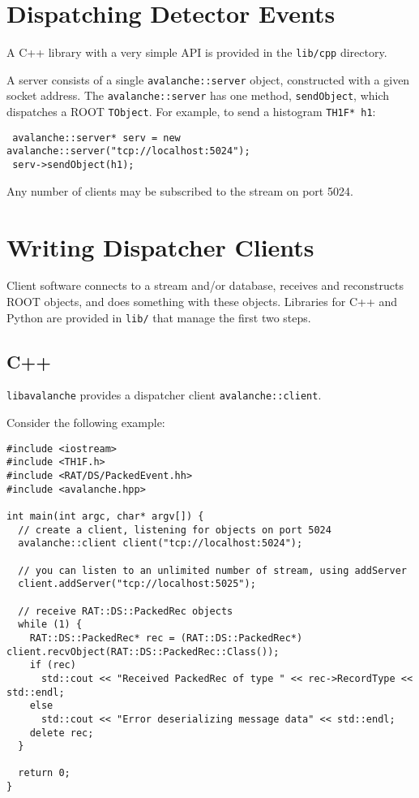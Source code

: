 \documentclass{article}
\begin{document}
\section{Dispatching Detector Events}
A C++ library with a very simple API is provided in the {\tt lib/cpp} directory.

A server consists of a single {\tt avalanche::server} object, constructed with a given socket address. The {\tt avalanche::server} has one method, {\tt sendObject}, which dispatches a ROOT {\tt TObject}. For example, to send a histogram {\tt TH1F* h1}:

\begin{verbatim}
 avalanche::server* serv = new avalanche::server("tcp://localhost:5024");
 serv->sendObject(h1);
\end{verbatim}
Any number of clients may be subscribed to the stream on port 5024.

\section{Writing Dispatcher Clients}
Client software connects to a stream and/or database, receives and reconstructs ROOT objects, and does something with these objects. Libraries for C++ and Python are provided in {\tt lib/} that manage the first two steps.

\subsection{C++}
{\tt libavalanche} provides a dispatcher client {\tt avalanche::client}.

Consider the following example:

\begin{verbatim}
#include <iostream>
#include <TH1F.h>
#include <RAT/DS/PackedEvent.hh>
#include <avalanche.hpp>

int main(int argc, char* argv[]) {
  // create a client, listening for objects on port 5024
  avalanche::client client("tcp://localhost:5024");

  // you can listen to an unlimited number of stream, using addServer
  client.addServer("tcp://localhost:5025");

  // receive RAT::DS::PackedRec objects
  while (1) {
    RAT::DS::PackedRec* rec = (RAT::DS::PackedRec*) client.recvObject(RAT::DS::PackedRec::Class());
    if (rec)
      std::cout << "Received PackedRec of type " << rec->RecordType << std::endl;
    else
      std::cout << "Error deserializing message data" << std::endl;
    delete rec;
  }

  return 0;
}
\end{verbatim}
\end{document}

